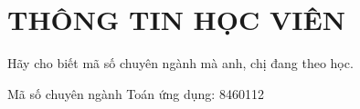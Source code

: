 \chapter{THÔNG TIN HỌC VIÊN}

\begin{question}
    Hãy cho biết mã số chuyên ngành mà anh, chị đang theo học.
\end{question}

\begin{answer}
    Mã số chuyên ngành Toán ứng dụng: 8460112
\end{answer}

